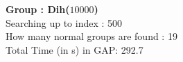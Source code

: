 \textbf{Group : Dih($10000$)}\\
Searching up to index : 500\\
How many normal groups are found : 19\\
Total Time (in s) in GAP: 292.7\\
